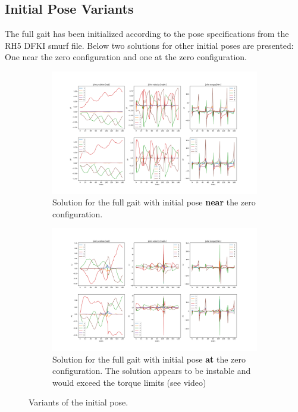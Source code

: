\subsection{Initial Pose Variants}
The full gait has been initialized according to the pose specifications from the RH5 DFKI smurf file. Below two solutions for other initial poses are presented: One near the zero configuration and one at the zero configuration.

\begin{figure}[h!]
\centering
\begin{subfigure}{.8\textwidth}
  \centering
  \includegraphics[width=1\linewidth]{Media/Crocoddyl/RH5/InitPoseVariants/RH5GaitInitNearZeroConfig_Solution.png}
  \caption{Solution for the full gait with initial pose \textbf{near} the zero configuration.}
\label{fig:rh5_full_gait}
\end{subfigure}
\begin{subfigure}{.8\textwidth}
  \centering
  \includegraphics[width=1\linewidth]{Media/Crocoddyl/RH5/InitPoseVariants/RH5GaitInitZeroConfig_Solution.png}
\caption{Solution for the full gait with initial pose \textbf{at} the zero configuration. The solution appears to be instable and would exceed the torque limits (see video)}
\label{fig:rh5_constrain_torque}
\end{subfigure}
\caption{Variants of the initial pose.}
\centering
\end{figure}




 